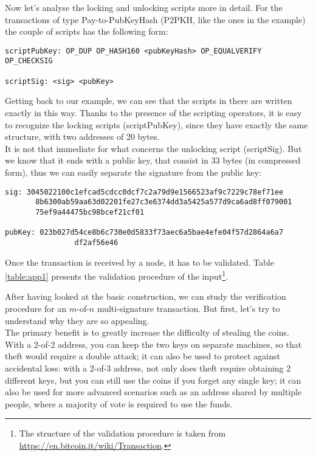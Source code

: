\bigskip
\noindent
Now let's analyse the locking and unlocking scripts more in detail. For the transactions of type Pay-to-PubKeyHash (P2PKH, like the ones in the example) the couple of scripts has the following form:

\bigskip
\begin{lstlisting}[frame=single]
scriptPubKey: OP_DUP OP_HASH160 <pubKeyHash> OP_EQUALVERIFY 							 OP_CHECKSIG

scriptSig: <sig> <pubKey>
\end{lstlisting}

\bigskip
\noindent
Getting back to our example, we can see that the scripts in there are written exactly in this way. Thanks to the presence of the scripting operators, it is easy to recognize the locking scripts (scriptPubKey), since they have exactly the same structure, with two addresses of 20 bytes.
\\
It is not that immediate for what concerns the unlocking script (scriptSig). But we know that it ends with a public key, that consist in 33 bytes (in compressed form), thus we can easily separate the signature from the public key:

\bigskip

\begin{lstlisting}[frame=single]
sig: 3045022100c1efcad5cdcc0dcf7c2a79d9e1566523af9c7229c78ef71ee
	   8b6300ab59aa63d02201fe27c3e6374dd3a5425a577d9ca6ad8ff079001
	   75ef9a44475bc98bcef21cf01
	   
pubKey: 023b027d54ce8b6c730e0d5833f73aec6a5bae4efe04f57d2864a6a7
				df2af56e46
\end{lstlisting}
Once the transaction is received by a node, it has to be validated. Table \ref{table:app1} presents the validation procedure of the input\footnote{The structure of the validation procedure is taken from \url{https://en.bitcoin.it/wiki/Transaction}.}.

\bigskip
\noindent
After having looked at the basic construction, we can study the verification procedure for an $m$-of-$n$ multi-signature transaction. But first, let's try to understand why they are so appealing. 
\\
The primary benefit is to greatly increase the difficulty of stealing the coins. With a 2-of-2 address, you can keep the two keys on separate machines, so that theft would require a double attack; it can also be used to protect against accidental loss: with a 2-of-3 address, not only does theft require obtaining 2 different keys, but you can still use the coins if you forget any single key; it can also be used for more advanced scenarios such as an address shared by multiple people, where a majority of vote is required to use the funds.

